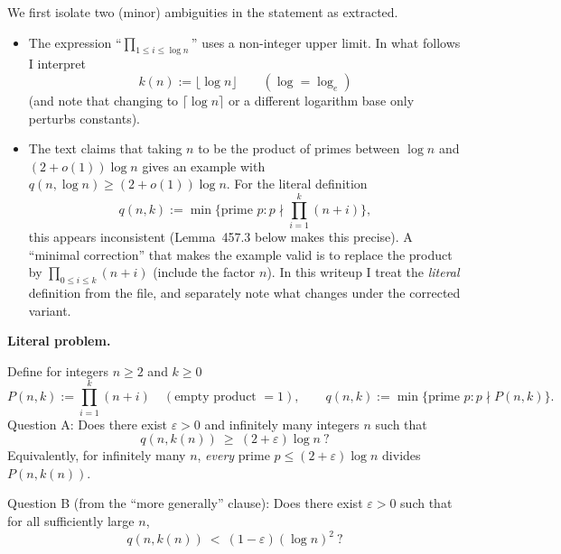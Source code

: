 We first isolate two (minor) ambiguities in the statement as extracted.

\begin{itemize}
\item The expression ``$\prod_{1\le i\le \log n}$'' uses a non-integer upper limit.  In what follows I interpret
\[k(n):=\lfloor \log n\rfloor\qquad(\log=\log_e)\]
(and note that changing to $\lceil\log n\rceil$ or a different logarithm base only perturbs constants).
\item The text claims that taking $n$ to be the product of primes between $\log n$ and $(2+o(1))\log n$ gives an example with $q(n,\log n)\ge (2+o(1))\log n$.  For the literal definition
\[q(n,k):=\min\{\text{prime }p: p\nmid \prod_{i=1}^k (n+i)\},\]
this appears inconsistent (Lemma~457.3 below makes this precise).  A ``minimal correction'' that makes the example valid is to replace the product by $\prod_{0\le i\le k}(n+i)$ (include the factor $n$).  In this writeup I treat the \emph{literal} definition from the file, and separately note what changes under the corrected variant.
\end{itemize}

\noindent\textbf{Literal problem.}

Define for integers $n\ge 2$ and $k\ge 0$
\[P(n,k):=\prod_{i=1}^k (n+i)\quad (\text{empty product }=1),\qquad q(n,k):=\min\{\text{prime }p: p\nmid P(n,k)\}.
\]
Question A: Does there exist $\varepsilon>0$ and infinitely many integers $n$ such that
\[q(n,k(n))\ \ge\ (2+\varepsilon)\log n\ ?\]
Equivalently, for infinitely many $n$, \emph{every} prime $p\le (2+\varepsilon)\log n$ divides $P(n,k(n))$.

Question B (from the ``more generally'' clause): Does there exist $\varepsilon>0$ such that for all sufficiently large $n$,
\[q(n,k(n))\ <\ (1-\varepsilon)(\log n)^2\ ?\]
